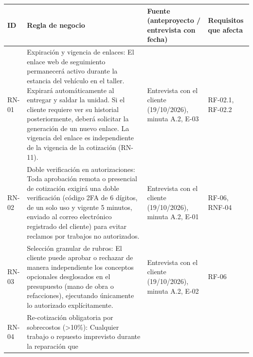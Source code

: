 {\def\LTcaptype{none} %
\begin{longtable}[]{@{}
  >{\raggedright\arraybackslash}p{}
  >{\raggedright\arraybackslash}p{}
  >{\raggedright\arraybackslash}p{}
  >{\raggedright\arraybackslash}p{}@{}}
\toprule\noalign{}
\begin{minipage}[b]{\linewidth}\raggedright
\textbf{ID}
\end{minipage} & \begin{minipage}[b]{\linewidth}\raggedright
\textbf{Regla de negocio}
\end{minipage} & \begin{minipage}[b]{\linewidth}\raggedright
\textbf{Fuente (anteproyecto / entrevista con fecha)}
\end{minipage} & \begin{minipage}[b]{\linewidth}\raggedright
\textbf{Requisitos que afecta}
\end{minipage} \\
\midrule\noalign{}
\endhead
\bottomrule\noalign{}
\endlastfoot
RN-01 & Expiración y vigencia de enlaces: El enlace web de seguimiento
permanecerá activo durante la estancia del vehículo en el taller.
Expirará automáticamente al entregar y saldar la unidad. Si el cliente
requiere ver su historial posteriormente, deberá solicitar la generación
de un nuevo enlace. La vigencia del enlace es independiente de la
vigencia de la cotización (RN-11). & Entrevista con el cliente (19/10/2026), minuta A.2, E-03 & RF-02.1, RF-02.2 \\
RN-02 & Doble verificación en autorizaciones: Toda aprobación remota o
presencial de cotización exigirá una doble verificación (código 2FA de 6
dígitos, de un solo uso y vigente 5 minutos, enviado al correo
electrónico registrado del cliente) para evitar reclamos por trabajos no
autorizados. & Entrevista con el cliente (19/10/2026), minuta A.2, E-01 & RF-06, RNF-04 \\
RN-03 & Selección granular de rubros: El cliente puede aprobar o
rechazar de manera independiente los conceptos opcionales desglosados en
el presupuesto (mano de obra o refacciones), ejecutando únicamente lo
autorizado explícitamente. & Entrevista con el cliente (19/10/2026), minuta A.2, E-02 &
RF-06 \\
RN-04 & Re-cotización obligatoria por sobrecostos (\textgreater10\%):
Cualquier trabajo o repuesto imprevisto durante la reparación que

\end{longtable}}
